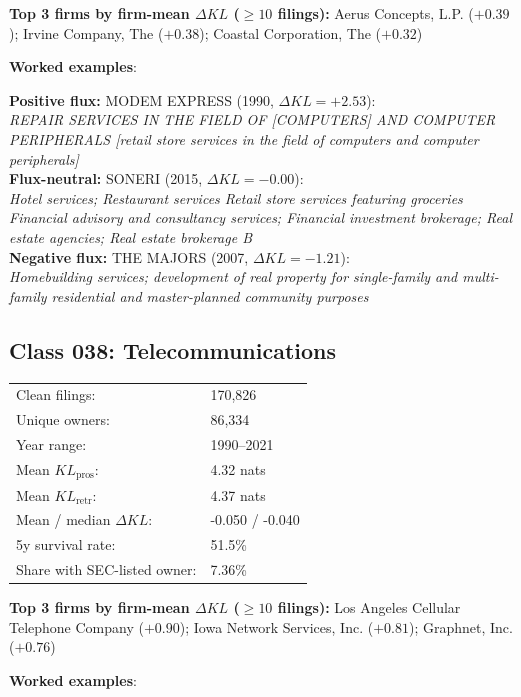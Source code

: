 \textbf{Top 3 firms by firm-mean $\Delta KL$ ($\geq 10$ filings):} Aerus Concepts, L.P. ($+0.39$); Irvine Company, The ($+0.38$); Coastal Corporation, The ($+0.32$)

\textbf{Worked examples}:

  \textbf{Positive flux:} \textsc{MODEM EXPRESS} (1990, $\Delta KL=+2.53$):\\
  \textit{REPAIR SERVICES IN THE FIELD OF [COMPUTERS] AND COMPUTER PERIPHERALS [retail store services in the field of computers and computer peripherals]}\\
  \textbf{Flux-neutral:} \textsc{SONERI} (2015, $\Delta KL=-0.00$):\\
  \textit{Hotel services; Restaurant services Retail store services featuring groceries Financial advisory and consultancy services; Financial investment brokerage; Real estate agencies; Real estate brokerage B}\\
  \textbf{Negative flux:} \textsc{THE MAJORS} (2007, $\Delta KL=-1.21$):\\
  \textit{Homebuilding services; development of real property for single-family and multi-family residential and master-planned community purposes}\\

\subsection*{Class 038: Telecommunications}
\label{app:industry-038}

\begin{tabular}{ll}
Clean filings: & 170,826 \\
Unique owners: & 86,334 \\
Year range: & 1990--2021 \\
Mean $KL_\text{pros}$: & 4.32 nats \\
Mean $KL_\text{retr}$: & 4.37 nats \\
Mean / median $\Delta KL$: & -0.050 / -0.040 \\
5y survival rate: & 51.5\% \\
Share with SEC-listed owner: & 7.36\% \\
\end{tabular}

\textbf{Top 3 firms by firm-mean $\Delta KL$ ($\geq 10$ filings):} Los Angeles Cellular Telephone Company ($+0.90$); Iowa Network Services, Inc. ($+0.81$); Graphnet, Inc. ($+0.76$)

\textbf{Worked examples}:

